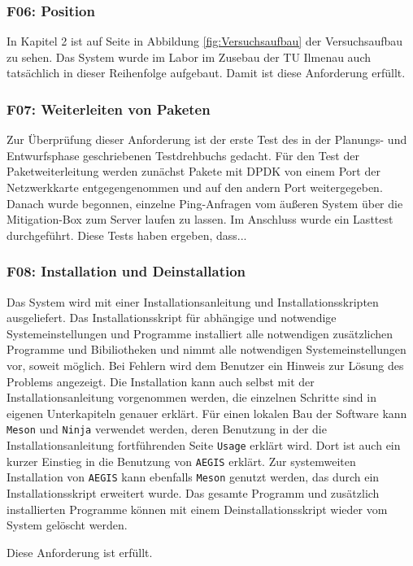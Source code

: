 \documentclass[../review_3.tex]{subfiles}
\begin{document}
\subsubsection{F06: Position}
In Kapitel 2 ist auf Seite \pageref{fig:Versuchsaufbau} in Abbildung \ref{fig:Versuchsaufbau} der Versuchsaufbau zu sehen. Das System wurde im Labor im Zusebau der TU Ilmenau auch tatsächlich in dieser Reihenfolge aufgebaut. Damit ist diese Anforderung erfüllt.

\subsubsection{F07: Weiterleiten von Paketen}
Zur Überprüfung dieser Anforderung ist der erste Test des in der Planungs- und Entwurfsphase geschriebenen Testdrehbuchs gedacht. Für den Test der Paketweiterleitung werden zunächst Pakete mit DPDK von einem Port der Netzwerkkarte entgegengenommen und auf den andern Port weitergegeben. Danach wurde begonnen, einzelne Ping-Anfragen vom äußeren System über die Mitigation-Box zum Server laufen zu lassen. Im Anschluss wurde ein Lasttest durchgeführt. Diese Tests haben ergeben, dass... %

\subsubsection{F08: Installation und Deinstallation}     
Das System wird mit einer Installationsanleitung und Installationsskripten ausgeliefert. Das Installationsskript für abhängige und notwendige Systemeinstellungen und Programme installiert alle notwendigen zusätzlichen Programme und Bibiliotheken und nimmt alle notwendigen Systemeinstellungen vor, soweit möglich. Bei Fehlern wird dem Benutzer ein Hinweis zur Lösung des Problems angezeigt. Die Installation kann auch selbst mit der Installationsanleitung vorgenommen werden, die einzelnen Schritte sind in eigenen Unterkapiteln genauer erklärt.
Für einen lokalen Bau der Software kann \texttt{Meson} und \texttt{Ninja} verwendet werden, deren Benutzung in der die Installationsanleitung fortführenden Seite \texttt{Usage} erklärt wird. Dort ist auch ein kurzer Einstieg in die Benutzung von \texttt{AEGIS} erklärt.  
Zur systemweiten Installation von \texttt{AEGIS} kann ebenfalls \texttt{Meson} genutzt werden, das durch ein Installationsskript erweitert wurde.
Das gesamte Programm und zusätzlich installierten Programme können mit einem Deinstallationsskript wieder vom System gelöscht werden.

Diese Anforderung ist erfüllt.
\end{document}
